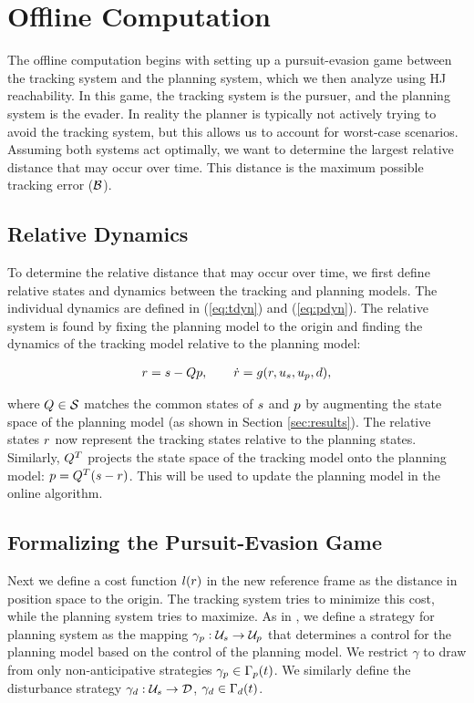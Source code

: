 \section{Offline Computation \label{sec:precomp}}
The offline computation begins with setting up a pursuit-evasion game \cite{Huang11, Chen17} between the tracking system and the planning system, which we then analyze using HJ reachability. In this game, the tracking system is the pursuer, and the planning system is the evader. In reality the planner is typically not actively trying to avoid the tracking system, but this allows us to account for worst-case scenarios. Assuming both systems act optimally, we want to determine the largest relative distance that may occur over time. This distance is the maximum possible tracking error ($\mathcal B$).

\subsection{Relative Dynamics}
To determine the relative distance that may occur over time, we first define relative states and dynamics between the tracking and planning models. The individual dynamics are defined in (\ref{eq:tdyn}) and (\ref{eq:pdyn}). The relative system is found by fixing the planning model to the origin and finding the dynamics of the tracking model relative to the planning model:

\begin{equation}
\label{eq:rdyn}
\begin{aligned}
r = s - Qp, \qquad \dot{r} = g(r, u_s, u_p, d),
\end{aligned}
\end{equation}

\noindent where $Q \in \mathcal{S}$ matches the common states of $s$ and $p$ by augmenting the state space of the planning model (as shown in Section \ref{sec:results}). The relative states $r$ now represent the tracking states relative to the planning states. Similarly, $Q^T$ projects the state space of the tracking model onto the planning model: $p = Q^T(s-r)$. This will be used to update the planning model in the online algorithm.

\subsection{Formalizing the Pursuit-Evasion Game}
Next we define a cost function $l(r)$ in the new reference frame as the distance in position space to the origin. The tracking system tries to minimize this cost, while the planning system tries to maximize. As in \cite{Mitchell05}, we define a strategy for planning system as the mapping $\gamma_{p} : \mathcal{U}_s \rightarrow \mathcal{U}_p$ that determines a control for the planning model based on the control of the planning model. We restrict $\gamma$ to draw from only non-anticipative strategies $\gamma_{p} \in \Gamma_p(t)$. We similarly define the disturbance strategy $\gamma_{d}: \mathcal{U}_s \rightarrow \mathcal{D}$, $\gamma_{d} \in \Gamma_d(t)$.

